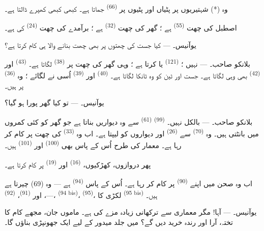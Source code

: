 وہ (*) شہتیریوں پر پٹیاں اور پٹیوں پر 
\textsuperscript{(66)} جماتا ہے۔ کبھی کبھی کھپرے ڈالتا ہے۔

اصطبل کی چھت  \textsuperscript{(55)} ہے ؛ گھر
کی چھت  \textsuperscript{(32)} ہے ؛ برآمدے کی چھت
 \textsuperscript{(24)} کی ہے۔

\textsc{یوآنیس}۔ --- کیا جست کی چھتوں پر بھی چھت بنانے والا ہی کام
کرتا ہے؟

\textsc{بلانکو صاحب}۔ --- نہیں ؛ 
\textsuperscript{(121)} یا  کرتا ہے ؛ وہی گھر
کی چھت پر  \textsuperscript{(38)} لگاتا ہے۔
 \textsuperscript{(43)} اور  \textsuperscript{(42)} بھی وہی لگاتا ہے۔ جست اور ٹین کو وہ
ٹانکا لگاتا ہے۔  \textsuperscript{(40)}
اور  \textsuperscript{(39)} اُسی نے
لگائے ؛ وہ  \textsuperscript{(36)} پر
ہیں۔

\textsc{یوآنیس}۔ --- تو کیا گھر پورا ہو گیا؟

\VUsaut{3.0mm}
\VUsaut{3.0mm}

\textsc{بلانکو صاحب}۔ --- بالکل نہیں۔ 
\textsuperscript{(99)}  \textsuperscript{(61)} سے وہ
دیواریں بناتا ہے جو گھر کو کئی کمروں میں بانٹتی ہیں۔ وہ
 \textsuperscript{(70)} سے 
\textsuperscript{(26)} اور دیواروں کو لیپتا ہے۔ اب وہ 
\textsuperscript{(33)} کی چھت پر کام کر رہا ہے۔ معمار کی طرح اُس کے
پاس بھی  \textsuperscript{(100)} اور 
\textsuperscript{(101)} ہیں۔

پھر  دروازوں، کھڑکیوں، 
\textsuperscript{(16)} اور 
\textsuperscript{(19)} پر کام کرتا ہے۔

اب وہ صحن میں اپنے  \textsuperscript{(90)} پر کام
کر رہا ہے۔ اُس کے پاس  \textsuperscript{(94)} ہے — وہ
 (69) چیرتا ہے —، اور 
\textsuperscript{(91)}،  \textsuperscript{(92)}،
 \textsuperscript{(94 bis)}، 
\textsuperscript{(95)}، لکڑی کا  \textsuperscript{(95 bis)}
ہیں۔

\textsc{یوآنیس}۔ --- آہا! مگر معماری سے ترکھانی زیادہ مزے کی ہے۔
ماموں جان، مجھے کام کا تختہ، آرا اور رندہ خرید دیں گے؟ میں جلد
میدور کے لیے ایک جھونپڑی بناؤں گا۔

